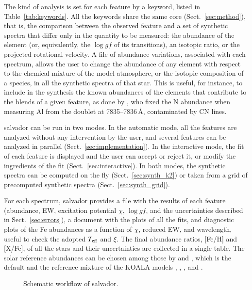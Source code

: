 \documentclass{aa}
\newcommand{\todo}[1]{\textcolor{red}{[#1]}}
\newcommand{\salvador}{salvador}   %
\begin{document}
The kind of analysis is set for each feature by a keyword, listed in
Table~\ref{tab:keywords}. All the keywords share the same core
(Sect.~\ref{sec:method}), that is, the comparison between the observed
feature and a set of synthetic spectra that differ only in the quantity
to be measured: the abundance of the element (or, equivalently, the
$\log gf$ of its transitions), an isotopic ratio, or the projected
rotational velocity. A file of abundance variations, associated with
each spectrum, allows the user to change the abundance of any element
with respect to the chemical mixture of the model atmosphere, or the
isotopic composition of a species, in all the synthetic spectra of
that star. This is useful, for instance, to include in the synthesis
the known abundances of the elements that contribute to the blends of
a given feature, as done by \citet{AlvarezGaray2024}, who fixed the N
abundance when measuring Al from the doublet at 7835--7836\,\AA,
contaminated by CN lines.

\salvador{} can be run in two modes. In the automatic mode, all the
features are analyzed without any intervention by the user, and
several features can be analyzed in parallel
(Sect.~\ref{sec:implementation}). In the interactive mode, the fit of
each feature is displayed and the user can accept or reject it, or
modify the ingredients of the fit (Sect.~\ref{sec:interactive}). In
both modes, the synthetic spectra can be computed on the fly
(Sect.~\ref{sec:synth_k2}) or taken from a grid of precomputed
synthetic spectra (Sect.~\ref{sec:synth_grid}).

For each spectrum, \salvador{} provides a file with the results of
each feature (abundance, EW, excitation potential $\chi$, $\log gf$,
and the uncertainties described in Sect.~\ref{sec:errors}), a
document with the plots of all the fits, and diagnostic plots of the
Fe abundances as a function of $\chi$, reduced EW, and wavelength,
useful to check the adopted $T_{\rm eff}$ and $\xi$. The final
abundance ratios, [Fe/H] and [X/Fe], of all the stars and their
uncertainties are collected in a single table. The solar reference
abundances can be chosen among those by \citet{Caffau2011} and
\citet{Lodders2010}, which is the default and the reference mixture
of the KOALA models \citep{Mucciarelli2026}, \citet{Grevesse1998},
\citet{Asplund2009}, and \citet{Magg2022}.

\begin{figure}
\centering
\fbox{\parbox[c][5cm][c]{0.9\hsize}{\centering
\todo{Fig. 1: flowchart of salvador (input files $\rightarrow$
normalization and local RV $\rightarrow$ synthetic spectra $\rightarrow$
$\chi^2$ minimization $\rightarrow$ EW, Monte Carlo, parameter
reruns $\rightarrow$ final abundances)}}}
\caption{Schematic workflow of \salvador.}
\label{fig:flowchart}
\end{figure}
\end{document}
